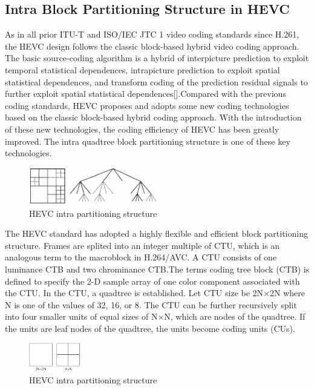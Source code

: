 \documentclass[journal,sort]{IEEEtran}
\begin{document}
\subsection{Intra Block Partitioning Structure in HEVC }
As in all prior ITU-T and ISO/IEC JTC 1 video coding
standards since H.261, the HEVC design follows the
classic block-based hybrid video coding approach. The basic source-coding algorithm is a hybrid
of interpicture prediction to exploit temporal statistical dependences,
intrapicture prediction to exploit spatial statistical
dependences, and transform coding of the prediction residual
signals to further exploit spatial statistical dependences[].Compared with the previous coding standards, HEVC proposes and adopts some new coding technologies based on  the classic block-based hybrid coding approach. With the introduction of these new technologies, the coding efficiency of HEVC has been greatly improved. The intra quadtree block partitioning structure is one of these key technologies.


\begin{figure}[htbp!]
	\centering
	\includegraphics[width=0.5\textwidth]{1.png}
	\caption{HEVC intra partitioning structure}
	\label{HEVC-part}
\end{figure}
The HEVC standard has adopted a highly flexible and efficient block partitioning structure. Frames are splited into an integer multiple of CTU, which is an analogous term to the macroblock in H.264/AVC. A CTU consists of one luminance CTB and two chrominance CTB.The terms coding
tree block (CTB) is defined to specify the 2-D sample array of one color component associated with the CTU. In the CTU, a quadtree is established. Let CTU size be 2N$\times$2N where N is one of the values of 32, 16, or 8. The CTU can be further recursively split into four smaller units of equal sizes of N$\times$N, which are nodes of the quadtree. If the
units are leaf nodes of the quadtree, the units become coding units (CUs).

\begin{figure}[htbp!]
	\centering
	\includegraphics[width=0.2\textwidth]{2.png}
	\caption{HEVC intra partitioning structure}
	\label{HEVC-part}
\end{figure}
\end{document}
